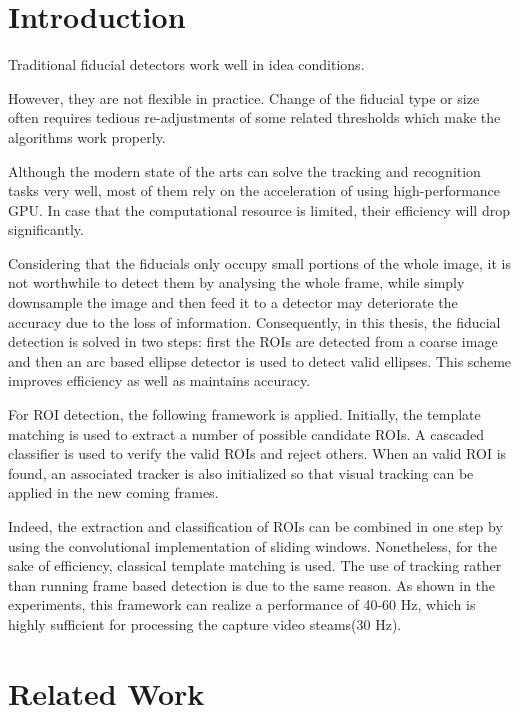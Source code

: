 \documentclass[a4paper]{report}
\begin{document}
\section{Introduction}

Traditional fiducial detectors work well in idea conditions. 

However, they are not flexible in practice. Change of the fiducial type or size often requires tedious re-adjustments of some related thresholds which make the algorithms work properly.



Although the modern state of the arts can solve the tracking and recognition tasks very well, most of them rely on the acceleration of using high-performance GPU. In case that the computational resource is limited, their efficiency will drop significantly.


Considering that the fiducials only occupy small portions of the whole image, it is not worthwhile to detect them by analysing the whole frame, while simply downsample the image and then feed it to a detector may deteriorate the accuracy due to the loss of information. Consequently, in this thesis, the fiducial detection is solved in two steps: first the ROIs are detected from a coarse image and then an arc based ellipse detector is used to detect valid ellipses. This scheme improves efficiency as well as maintains accuracy. 

For ROI detection, the following framework is applied. Initially, the template matching is used to extract a number of possible candidate ROIs. A cascaded classifier is used to verify the valid ROIs and reject others. When an valid ROI is found, an associated tracker is also initialized so that visual tracking can be applied in the new coming frames. 

Indeed, the extraction and classification of ROIs can be combined in one step by using the convolutional implementation of sliding windows. Nonetheless, for the sake of efficiency, classical template matching is used. The use of tracking rather than running frame based detection is due to the same reason. As shown in the experiments, this framework can realize a performance of 40-60 Hz, which is highly sufficient for processing the capture video steams(30 Hz).



\section{Related Work}
\end{document}
